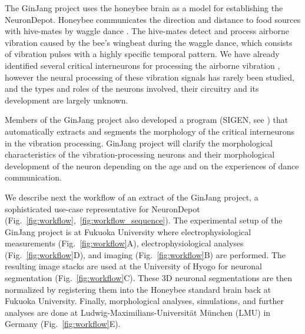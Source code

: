 \documentclass{frontiersSCNS} %
\begin{document}
The GinJang project uses the honeybee brain as a model for establishing the
NeuronDepot. Honeybee communicates the direction and distance to food sources
with hive-mates by waggle dance \citep{Frisch1967}. The hive-mates detect and
process airborne vibration caused by the bee's wingbeat during the waggle
dance, which consists of vibration pulses with a highly specific temporal
pattern. We have already identified several critical interneurons for
processing the airborne vibration \citep{Ai2007, Ai2009, Ai2010, Ai2012,
Ai2013}, however the neural processing of these
vibration signals has rarely been studied, and the types and roles of the
neurons involved, their circuitry and its development are largely unknown. 

Members of the GinJang project also developed a program (SIGEN, see
\citep{Minemoto}) that automatically extracts and segments the morphology of
the critical interneurons in the vibration processing. GinJang project will
clarify the morphological characteristics of the vibration-processing neurons
and their morphological development of the neuron depending on the age and on
the experiences of dance communication.  

We describe next the workflow of an extract of the GinJang project, a
sophisticated use-case representative for NeuronDepot
(Fig.~\ref{fig:workflow},~\ref{fig:workflow_sequence}). The experimental setup
of the GinJang project is at Fukuoka University where electrophysiological
measurements (Fig.~\ref{fig:workflow}A), electrophysiological analyses
(Fig.~\ref{fig:workflow}D), and imaging (Fig.~\ref{fig:workflow}B) are
performed. The resulting image stacks are used at the University of Hyogo for
neuronal segmentation (Fig.~\ref{fig:workflow}C). These 3D neuronal
segmentations are then normalized by registering them into the Honeybee
standard brain back at Fukuoka University. Finally, morphological analyses,
simulations, and further analyses are done at Ludwig-Maximilians-Universität
München (LMU) in Germany (Fig.~\ref{fig:workflow}E).
\end{document}
